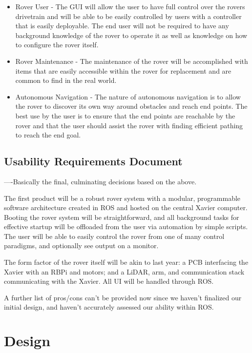 \documentclass[a4paper, 10pt]{article}
\begin{document}
	\begin{itemize}
		\item
		Rover User - The GUI will allow the user to have full control over the rovers drivetrain and will be able to be easily controlled by users with a controller that is easily deployable. The end user will not be required to have any background knowledge of the rover to operate it as well as knowledge on how to configure the rover itself.

		\item
		Rover Maintenance - The maintenance of the rover will be accomplished with items that are easily accessible within the rover for replacement and are common to find in the real world.

		\item
		Autonomous Navigation - The nature of autonomous navigation is to allow the rover to discover its own way around obstacles and reach end points. The best use by the user is to ensure that the end points are reachable by the rover and that the user should assist the rover with finding efficient pathing to reach the end goal. 
\end{itemize}
	
	\subsection{Usability Requirements Document}
	----Basically the final, culminating decisions based on the above.
	
	The first product will be a robust rover system with a modular, programmable software architecture created in ROS and hosted on the central Xavier computer. Booting the rover system will be straightforward, and all background tasks for effective startup will be offloaded from the user via automation by simple scripts. The user will be able to easily control the rover from one of many control paradigms, and optionally see output on a monitor. 
	
The form factor of the rover itself will be akin to last year: a PCB interfacing the Xavier with an RBPi and motors; and a LiDAR, arm, and communication stack communicating with the Xavier. All UI will be handled through ROS. 

A further list of pros/cons can't be provided now since we haven't finalized our initial design, and haven't accurately assessed our ability within ROS.

\pagebreak
	
\section{Design}
\end{document}

